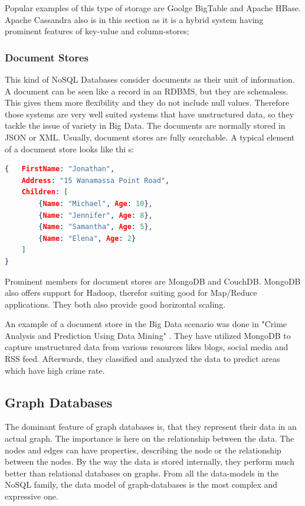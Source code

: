 \documentclass{acm_proc_article-sp}
\begin{document}
Popular examples of this type of storage are Goolge BigTable and Apache HBase. Apache Cassandra also is in this section as it is a hybrid system having prominent features of key-value and column-stores\cite{Nayak_typeof}\cite{DBLP:conf/services/GudivadaRR14};


\subsubsection{Document Stores}

This kind of NoSQL Databases consider documents as their unit of information. A
document can be seen like a record in an RDBMS, but they are schemaless. This
gives them more flexibility and they do not include null values. Therefore those systems are very well suited systems that have unstructured data, so they tackle the issue of variety in Big Data.
The documents are normally stored in JSON or XML. Usually, document stores are fully searchable. A typical element of a document store looks
like thi s:

\begin{lstlisting}[language=json,firstnumber=1]
{	FirstName: "Jonathan",
	Address: "15 Wanamassa Point Road",
	Children: [
		{Name: "Michael", Age: 10},
		{Name: "Jennifer", Age: 8},
		{Name: "Samantha", Age: 5},
		{Name: "Elena", Age: 2}
	]
}
\end{lstlisting}

Prominent members for document stores are MongoDB and CouchDB. MongoDB also offers support for Hadoop, therefor suiting good for Map/Reduce applications. They both also provide good horizontal scaling.

An example of a document store in the Big Data scenario was done in "Crime Analysis and Prediction Using Data Mining"\cite{crime} . They have utilized MongoDB to capture unstructured data from various resources likes blogs, social media and RSS feed. Afterwards, they classified and analyzed the data to predict areas which have high crime rate.

\subsection{Graph Databases}

The dominant feature of graph databases is, that they represent their data in an actual graph. The importance is here on the relationship between the data. The nodes and edges can have properties, describing the node or the relationship between the nodes. By the way the data is stored internally, they perform much better than relational databases on graphs. From all the data-models in the NoSQL family, the data model of graph-databases is the most complex and expressive one.
\end{document}

